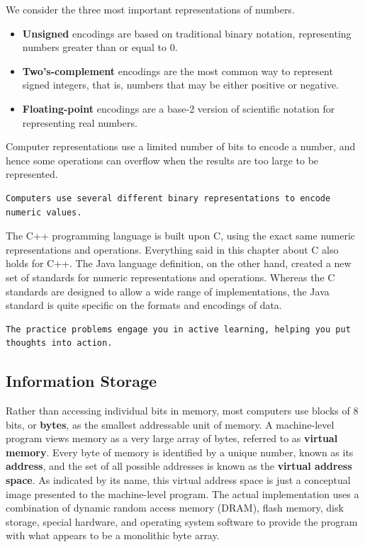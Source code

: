 \documentclass[11pt]{article}
\begin{document}
We consider the three most important representations of numbers.\\
\begin{itemize}
\item \textbf{Unsigned} encodings are based on traditional binary notation, representing numbers greater than or equal to 0.\\
\item \textbf{Two’s-complement} encodings are the most common way to represent signed integers, that is, numbers that may be either positive or negative.\\
\item \textbf{Floating-point} encodings are a base-2 version of scientific notation for representing real numbers.\\
\end{itemize}


Computer representations use a limited number of bits to encode a number, and hence some operations can overflow when the results are too large to be represented.\\

\begin{verbatim}
Computers use several different binary representations to encode numeric values.
\end{verbatim}


The C++ programming language is built upon C, using the exact same numeric representations and operations. Everything said in this chapter about C also holds for C++. The Java language definition, on the other hand, created a new set of standards for numeric representations and operations. Whereas the C standards are designed to allow a wide range of implementations, the Java standard is quite specific on the formats and encodings of data.\\

\begin{verbatim}
The practice problems engage you in active learning, helping you put thoughts into action. 
\end{verbatim}


\subsection{Information Storage}
\label{sec:orgcc1bb54}
Rather than accessing individual bits in memory, most computers use blocks of 8 bits, or \textbf{bytes}, as the smallest addressable unit of memory. A machine-level program views memory as a very large array of bytes, referred to as \textbf{virtual memory}. Every byte of memory is identified by a unique number, known as its \textbf{address}, and the set of all possible addresses is known as the \textbf{virtual address space}. As indicated by its name, this virtual address space is just a conceptual image presented to the machine-level program. The actual implementation uses a combination of dynamic random access memory (DRAM), flash memory, disk storage, special hardware, and operating system software to provide the program with what appears to be a monolithic byte array.\\
\end{document}
